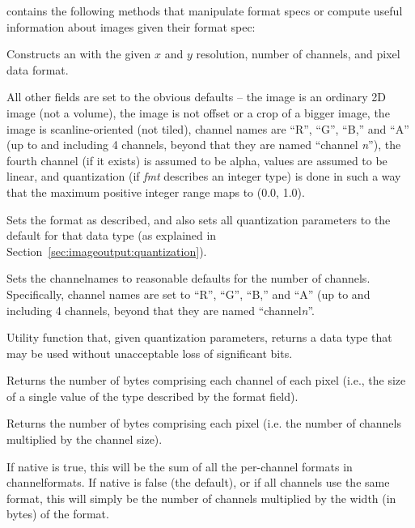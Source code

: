 \noindent \ImageSpec contains the following methods that
manipulate format specs or compute useful information about images given
their format spec:

Constructs an \ImageSpec with the given $x$ and $y$ resolution, number
of channels, and pixel data format.

All other fields are set to the obvious defaults -- the image is an
ordinary 2D image (not a volume), the image is not offset or a crop of a
bigger image, the image is scanline-oriented (not tiled), channel names
are ``R'', ``G'', ``B,'' and ``A'' (up to and including 4 channels,
beyond that they are named ``channel \emph{n}''), the fourth channel (if
it exists) is assumed to be alpha, values are assumed to be linear, and
quantization (if \emph{fmt} describes an integer type) is done in
such a way that the maximum positive integer range maps to (0.0, 1.0).
\apiend

Sets the format as described, and also sets all quantization parameters
to the default for that data type (as explained in 
Section~\ref{sec:imageoutput:quantization}).
\apiend

Sets the {\cf channelnames} to reasonable defaults for the number of
channels.  Specifically, channel names are set to ``R'', ``G'', ``B,''
and ``A'' (up to and including 4 channels, beyond that they are named
``channel\emph{n}''.
\apiend

Utility function that, given quantization parameters, returns a data
type that may be used without unacceptable loss of significant bits.
\apiend

Returns the number of bytes comprising each channel of each pixel (i.e.,
the size of a single value of the type described by the {\cf format} field).
\apiend

Returns the number of bytes comprising each pixel (i.e. the number of
channels multiplied by the channel size).

If {\cf native} is true, this will be the sum of all the per-channel
formats in {\cf channelformats}.  If {\cf native} is false (the
default), or if all channels use the same format, this will simply be
the number of channels multiplied by the width (in bytes) of the {\cf format}.
\apiend

